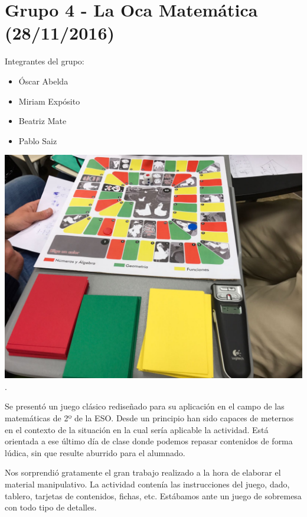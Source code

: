 \newpage
\section*{Grupo 4 - La Oca Matemática (28/11/2016)}

Integrantes del grupo:

\begin{itemize}

\item Óscar Abelda
\item Miriam Expósito
\item Beatriz Mate
\item Pablo Saiz
\end{itemize}

\begin{minipage}[hbtp]{1.0\linewidth}
\centering
\includegraphics[scale=0.2]{img/grupo4_1.jpg}
.
\end{minipage}

Se presentó un juego clásico rediseñado para su aplicación en el campo de las matemáticas de 2º de la ESO. Desde un principio han sido capaces de meternos en el contexto de la situación en la cual sería aplicable la actividad. Está orientada a ese último día de clase donde podemos repasar contenidos de forma lúdica, sin que resulte aburrido para el alumnado. 

Nos sorprendió gratamente el gran trabajo realizado a la hora de elaborar el material manipulativo. La actividad contenía las instrucciones del juego, dado, tablero, tarjetas de contenidos, fichas, etc. Estábamos ante un juego de sobremesa con todo tipo de detalles.

